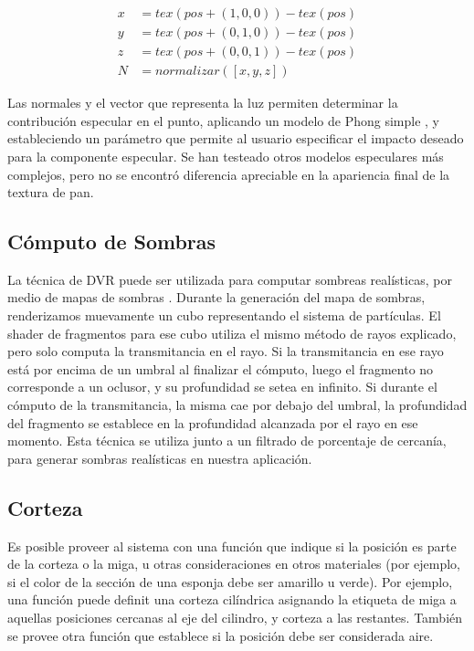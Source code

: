 \begin{equation}
\begin{aligned}
x &= tex(pos+(1,0,0)) - tex(pos)\\
y &= tex(pos+(0,1,0)) - tex(pos)\\
z &= tex(pos+(0,0,1)) - tex(pos) \\
N &= normalizar([x,y,z])
\end{aligned}
\end{equation}

Las normales y el vector que representa la luz permiten determinar la contribución especular en el punto, aplicando un modelo de Phong simple \cite{Phong1973}, y estableciendo un parámetro que permite al usuario especificar el impacto deseado para la componente especular.
Se han testeado otros modelos especulares más complejos, pero no se encontró diferencia apreciable en la apariencia final de la textura de pan.

\subsection{Cómputo de Sombras}
La técnica de DVR puede ser utilizada para computar sombreas realísticas, por medio de mapas de sombras \cite{Williams1978}.
Durante la generación del mapa de sombras, renderizamos muevamente un cubo representando el sistema de partículas.
El shader de fragmentos para ese cubo utiliza el mismo método de rayos explicado, pero solo computa la transmitancia en el rayo.
Si la transmitancia en ese rayo está por encima de un umbral al finalizar el cómputo, luego el fragmento no corresponde a un oclusor, y su profundidad se setea en infinito.
Si durante el cómputo de la transmitancia, la misma cae por debajo del umbral, la profundidad del fragmento se establece en la profundidad alcanzada por el rayo en ese momento.
Esta técnica se utiliza junto a un filtrado de porcentaje de cercanía, para generar sombras realísticas en nuestra aplicación.


\subsection{Corteza}
Es posible proveer al sistema con una función que indique si la posición es parte de la corteza o la miga, u otras consideraciones en otros materiales (por ejemplo, si el color de la sección de una esponja debe ser amarillo u verde).
Por ejemplo, una función puede definit una corteza cilíndrica asignando la etiqueta de miga a aquellas posiciones cercanas al eje del cilindro, y corteza a las restantes.
También se provee otra función que establece si la posición debe ser considerada aire.

